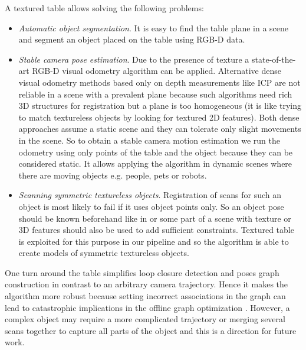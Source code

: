\documentclass[letterpaper, 10 pt, conference]{ieeeconf}  %
\begin{document}
A textured table allows solving the following problems:

\begin{itemize}

\item \textit{Automatic object segmentation}. It is easy to find the table plane
in a scene and segment an object placed on the table using RGB-D data.
\item \textit{Stable camera pose estimation}. Due to the presence of texture
a state-of-the-art RGB-D visual odometry algorithm can be applied.
Alternative dense visual odometry methods based only on depth measurements
like ICP are not reliable in a scene with a prevalent plane \cite{rusinkiewicz2002real}
because such algorithms need rich 3D structures for registration but a plane is too homogeneous
(it is like trying to match textureless objects by looking for textured 2D features).
Both dense approaches
assume a static scene and they can tolerate only slight movements in the scene.
So to obtain a stable camera motion estimation we run the odometry using only
points of the table and the object because they can be considered static.
It allows applying the algorithm in dynamic scenes where there are moving objects e.g. people, pets or robots.
\item \textit{Scanning symmetric textureless objects}. Registration of scans for such an object
is most likely to fail if it uses object points only. So an object pose should be known beforehand like in \cite{krainin2011manipulator}
or some part of a scene with
texture or 3D features should also be used to add sufficient constraints.
Textured table is exploited for this purpose in our pipeline
and so the algorithm is able to create models of symmetric textureless objects.
\end{itemize}


One turn around the table simplifies loop closure detection and poses graph construction
in contrast to an arbitrary camera trajectory.
Hence it makes the algorithm more robust because setting incorrect associations
in the graph can lead to catastrophic implications in the offline graph
optimization \cite{sunderhauf2012switchable}.
However, a complex object may require a more complicated trajectory
or merging several scans together to capture all parts of the object %
and this is a direction for future work.
\end{document}
